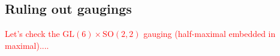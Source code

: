 \documentclass[a4paper, 11pt]{article}
\numberwithin{equation}{section}
\newcommand{\ov}[1]{\overline{#1}}
\newcommand{\GL}[1]{\mathrm{GL}( #1 )}
\newcommand{\SO}[1]{\mathrm{SO}( #1 )}
\newcommand{\En}[1]{E_{#1(#1)}}
\newcommand{\+}{\oplus}
\DeclareMathOperator{\tr}{Tr}
\newcommand{\EM}[1]{\textcolor{red}{#1}}
\newcommand{\MG}[1]{\textcolor{blue}{#1}}
\begin{document}

\subsection{Ruling out gaugings}
\EM{Let's check the $\GL{6} \times \SO{2,2}$ gauging (half-maximal embedded in maximal)....}
\end{document}
